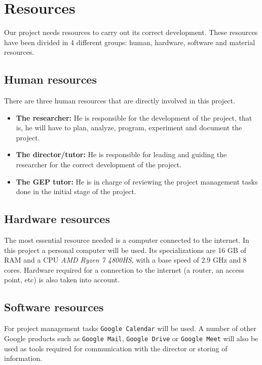 \section{Resources}

Our project needs resources to carry out its correct development. These resources have been divided in 4 different groups: human, hardware, software and material resources.

\subsection{Human resources}
\label{sec:human_resources}

There are three human resources that are directly involved in this project.

\begin{itemize}
    \item \textbf{The researcher:} He is responsible for the development of the project, that is, he will have to plan, analyze, program, experiment and document the project.
    \item \textbf{The director/tutor:} He is responsible for leading and guiding the researcher for the correct development of the project.
    \item \textbf{The GEP tutor:} He is in charge of reviewing the project management tasks done in the initial stage of the project.
\end{itemize}

\subsection{Hardware resources}
\label{sec:hardware_resources}

The most essential resource needed is a computer connected to the internet. In this project a personal computer will be used. Its specializations are 16 GB of RAM and a CPU \emph{AMD Ryzen 7 4800HS}, with a base speed of 2.9 GHz and 8 cores. Hardware required for a connection to the internet (a router, an access point, etc) is also taken into account.

\subsection{Software resources}

For project management tasks \texttt{Google Calendar} will be used. A number of other Google products such as \texttt{Google Mail}, \texttt{Google Drive} or \texttt{Google Meet} will also be used as tools required for communication with the director or storing of information.

